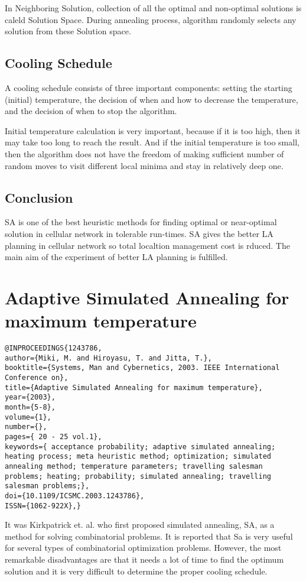 \documentclass[pdftex,11pt]{article}
\begin{document}
In Neighboring Solution, collection of all the optimal and non-optimal solutions is caleld Solution Space. During annealing process, algorithm randomly selects any solution from these Solution space.

\subsection{Cooling Schedule}
A cooling schedule consists of three important components: setting the starting (initial) temperature, the decision of when and how to decrease the temperature, and the decision of when to stop the algorithm.

Initial temperature calculation is very important, because if it is too high, then it may take too long to reach the result. And if the initial temperature is too small, then the algorithm does not have the freedom of making sufficient number of random moves to visit different local minima and stay in relatively deep one.

\subsection{Conclusion}
SA is one of the best heuristic methods for finding optimal or near-optimal solution in cellular network in tolerable run-times. SA gives the better LA planning in cellular network so total localtion management cost is rduced. The main aim of the experiment of better LA planning is fulfilled.

\section*{Adaptive Simulated Annealing for maximum temperature}
\begin{verbatim}
@INPROCEEDINGS{1243786, 
author={Miki, M. and Hiroyasu, T. and Jitta, T.}, 
booktitle={Systems, Man and Cybernetics, 2003. IEEE International Conference on},
title={Adaptive Simulated Annealing for maximum temperature}, 
year={2003}, 
month={5-8}, 
volume={1}, 
number={}, 
pages={ 20 - 25 vol.1}, 
keywords={ acceptance probability; adaptive simulated annealing; heating process; meta heuristic method; optimization; simulated annealing method; temperature parameters; travelling salesman problems; heating; probability; simulated annealing; travelling salesman problems;}, 
doi={10.1109/ICSMC.2003.1243786}, 
ISSN={1062-922X},}
\end{verbatim}

It was Kirkpatrick et. al. who first proposed simulated annealing, SA, as a method for solving combinatorial problems. It is reported that Sa is very useful for several types of combinatorial optimization problems. However, the most remarkable disadvantages are that it needs a lot of time to find the optimum solution and it is very difficult to determine the proper cooling schedule.
\end{document}
